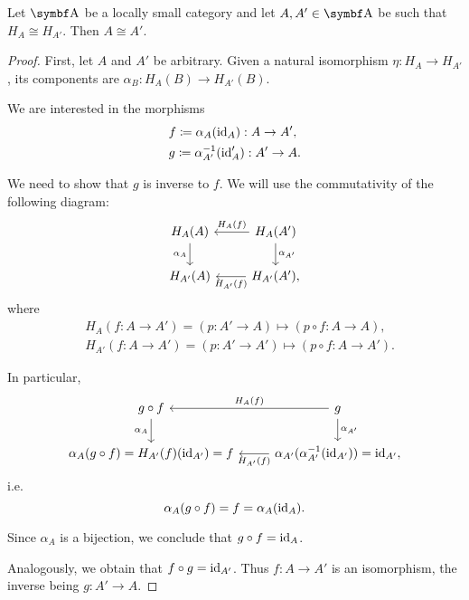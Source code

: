 \begin{proposition}\label{def:yoneda_embedding_is_injective}\cite[exercise 4.1.27]{Leinster2014}
  Let \( \Bold A \) be a locally small category and let \( A, A' \in \Bold A \) be such that \( H_A \cong H_{A'} \). Then \( A \cong A' \).
\end{proposition}
\begin{proof}
  First, let \( A \) and \( A' \) be arbitrary. Given a natural isomorphism \( \eta: H_A \to H_{A'} \), its components are \( \alpha_B: H_A(B) \to H_{A'}(B) \).

  We are interested in the morphisms
  \begin{align*}
    &f \coloneqq \alpha_A(\operatorname{id}_A): A \to A', \\
    &g \coloneqq \alpha_{A'}^{-1}(\operatorname{id}_A'): A' \to A.
  \end{align*}

  We need to show that \( g \) is inverse to \( f \). We will use the commutativity of the following diagram:
  \begin{equation*}
    \begin{tikzcd}
      H_A(A) \arrow[d, "\alpha_A"'] & H_A(A') \arrow[d, "\alpha_{A'}"] \arrow[l, "H_A(f)"'] \\
      H_{A'}(A)                     & H_{A'}(A') \arrow[l, "H_{A'}(f)"],
    \end{tikzcd}
  \end{equation*}
  where
  \begin{align*}
    &H_A(f: A \to A') = (p: A' \to A) \mapsto (p \circ f: A \to A), \\
    &H_{A'}(f: A \to A') = (p: A' \to A') \mapsto (p \circ f: A \to A').
  \end{align*}

  In particular,
  \begin{equation*}
    \begin{tikzcd}
      g \circ f \arrow[d, "\alpha_A"']              & g \arrow[d, "\alpha_{A'}"] \arrow[l, "H_A(f)"'] \\
      \alpha_A(g \circ f) = H_{A'}(f)(\Id_{A'}) = f & \alpha_{A'}(\alpha_{A'}^{-1}(\Id_{A'})) = \Id_{A'} \arrow[l, "H_{A'}(f)"],
    \end{tikzcd}
  \end{equation*}
  i.e.
  \begin{equation*}
    \alpha_A(g \circ f) = f = \alpha_A(\operatorname{id}_A).
  \end{equation*}

  Since \( \alpha_A \) is a bijection, we conclude that \( g \circ f = \operatorname{id}_A \).

  Analogously, we obtain that \( f \circ g = \operatorname{id}_{A'} \). Thus \( f: A \to A' \) is an isomorphism, the inverse being \( g: A' \to A \).
\end{proof}

